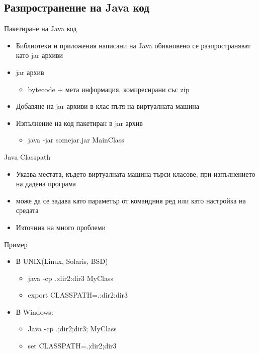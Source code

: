 \documentclass{beamer}
\begin{document}
\subsection{Разпространение на Java код}
\begin{frame}{Пакетиране на Java код}
  \transdissolve
  \begin{itemize}
  \item Библиотеки и приложения написани на Java обикновено се
    разпространяват като jar архиви
  \item jar архив
    \begin{itemize}
    \item bytecode + мета информация, компресирани със zip
    \end{itemize} \pause
  \item Добавяне на jar архиви в клас пътя на виртуалната машина \pause
  \item Изпълнение на код пакетиран в jar архив
    \begin{itemize}
    \item java -jar somejar.jar MainClass
    \end{itemize}
  \end{itemize}
\end{frame}

\begin{frame}{Java Classpath}
  \transdissolve
  \begin{itemize}
  \item Указва местата, където виртуалната машина търси класове, при
    изпълнението на дадена програма \pause
  \item може да се задава като параметър от командния ред или като
    настройка на средата \pause
  \item Източник на много проблеми
  \end{itemize}
\end{frame}

\begin{frame}{Пример}
  \transdissolve
  \begin{itemize}
  \item В UNIX(Linux, Solaris, BSD)
      \begin{itemize}
      \item java -cp .:dir2:dir3 MyClass
      \item export CLASSPATH=.:dir2:dir3
      \end{itemize} \pause
    \item В Windows:
      \begin{itemize}
      \item Java -cp .;dir2;dir3; MyClass
      \item set CLASSPATH=.;dir2;dir3
      \end{itemize}
  \end{itemize}
\end{frame}
\end{document}
